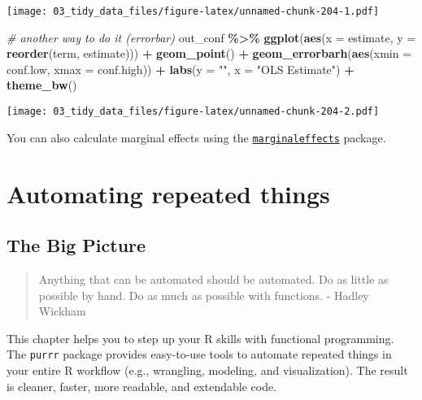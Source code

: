 \documentclass[
]{book}
\newenvironment{Shaded}{\begin{snugshade}}{\end{snugshade}}
\newcommand{\CommentTok}[1]{\textcolor[rgb]{0.56,0.35,0.01}{\textit{#1}}}
\newcommand{\DataTypeTok}[1]{\textcolor[rgb]{0.13,0.29,0.53}{#1}}
\newcommand{\KeywordTok}[1]{\textcolor[rgb]{0.13,0.29,0.53}{\textbf{#1}}}
\newcommand{\NormalTok}[1]{#1}
\newcommand{\OperatorTok}[1]{\textcolor[rgb]{0.81,0.36,0.00}{\textbf{#1}}}
\newcommand{\StringTok}[1]{\textcolor[rgb]{0.31,0.60,0.02}{#1}}
\begin{document}
\texttt{[image: 03\_tidy\_data\_files/figure-latex/unnamed-chunk-204-1.pdf]}

\begin{Shaded}
\begin{Highlighting}[]
\CommentTok{\# another way to do it (errorbar)}
\NormalTok{out\_conf }\OperatorTok{\%\textgreater{}\%}
\StringTok{  }\KeywordTok{ggplot}\NormalTok{(}\KeywordTok{aes}\NormalTok{(}\DataTypeTok{x =}\NormalTok{ estimate, }\DataTypeTok{y =} \KeywordTok{reorder}\NormalTok{(term, estimate))) }\OperatorTok{+}
\StringTok{  }\KeywordTok{geom\_point}\NormalTok{() }\OperatorTok{+}
\StringTok{  }\KeywordTok{geom\_errorbarh}\NormalTok{(}\KeywordTok{aes}\NormalTok{(}\DataTypeTok{xmin =}\NormalTok{ conf.low, }\DataTypeTok{xmax =}\NormalTok{ conf.high)) }\OperatorTok{+}
\StringTok{  }\KeywordTok{labs}\NormalTok{(}\DataTypeTok{y =} \StringTok{""}\NormalTok{, }\DataTypeTok{x =} \StringTok{"OLS Estimate"}\NormalTok{) }\OperatorTok{+}
\StringTok{  }\KeywordTok{theme\_bw}\NormalTok{()}
\end{Highlighting}
\end{Shaded}

\texttt{[image: 03\_tidy\_data\_files/figure-latex/unnamed-chunk-204-2.pdf]}

You can also calculate marginal effects using the \href{https://vincentarelbundock.github.io/marginaleffects/}{\texttt{marginaleffects}} package.

\hypertarget{functional_programming}{%
\chapter{Automating repeated things}\label{functional_programming}}

\hypertarget{the-big-picture-5}{%
\section{The Big Picture}\label{the-big-picture-5}}

\begin{quote}
Anything that can be automated should be automated. Do as little as possible by hand. Do as much as possible with functions.
- Hadley Wickham
\end{quote}

This chapter helps you to step up your R skills with functional programming. The \texttt{purrr} package provides easy-to-use tools to automate repeated things in your entire R workflow (e.g., wrangling, modeling, and visualization). The result is cleaner, faster, more readable, and extendable code.
\end{document}
